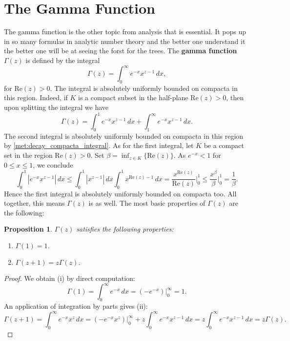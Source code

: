 \documentclass[12pt]{book}
\newtheorem{proposition}{Proposition}[section]
\theoremstyle{definition}\newframedtheorem{method}{Method}
\renewcommand{\b}{\beta}
\newcommand{\G}{\Gamma}
\newcommand{\<}{\langle}
\renewcommand{\>}{\rangle}
\renewcommand{\Re}{\mathrm{Re}}
\begin{document}
  \section{The Gamma Function}
    The gamma function is the other topic from analysis that is essential. It pops up in so many formulas in analytic number theory and the better one understand it the better one will be at seeing the forst for the trees. The \textbf{gamma function} $\G(z)$ is defined by the integral
    \[
      \G(z) = \int_{0}^{\infty}e^{-x}x^{z-1}\,dx,
    \]
    for $\Re(z) > 0$. The integral is absolutely uniformly bounded on compacta in this region. Indeed, if $K$ is a compact subset in the half-plane $\Re(z) > 0$, then upon splitting the integral we have
    \[
      \G(z) = \int_{0}^{1}e^{-x}x^{z-1}\,dx+\int_{1}^{\infty}e^{-x}x^{z-1}\,dx.
    \]
    The second integral is absolutely uniformly bounded on compacta in this region by \cref{met:decay_compacta_integral}. As for the first integral, let $K$ be a compact set in the region $\Re(z) > 0$. Set $\b = \inf_{z \in K}\{\Re(z)\}$. As $e^{-x} < 1$ for $0 \le x \le 1$, we conclude
    \[
      \int_{0}^{1}|e^{-x}x^{z-1}|\,dx \le \int_{0}^{1}|x^{z-1}|\,dx \int_{0}^{1}x^{\Re(z)-1}\,dx = \frac{x^{\Re(z)}}{\Re(z)}\bigg|_{0}^{1} \le \frac{x^{\b}}{\b}\bigg|_{0}^{1} = \frac{1}{\b}.
    \]
    Hence the first integral is absolutely uniformly bounded on compacta too. All together, this means $\G(z)$ is as well. The most basic properties of $\G(z)$ are the following:

    \begin{proposition}\label{prop:Factorial_properties_of_gamma_function}
      $\G(z)$ satisfies the following properties:
      \begin{enumerate}[label=(\roman*)]
        \item $\G(1) = 1$.
        \item $\G(z+1) = z\G(z)$.
      \end{enumerate}
    \end{proposition}
    \begin{proof}
      We obtain (i) by direct computation:
      \[
        \G(1) = \int_{0}^{\infty}e^{-x}\,dx = (-e^{-x})\bigg|_{0}^{\infty} = 1.
      \]
      An application of integration by parts gives (ii):
      \[
        \G(z+1) = \int_{0}^{\infty}e^{-x}x^{z}\,dx = (-e^{-x}x^{z})\bigg|_{0}^{\infty}+z\int_{0}^{\infty}e^{-x}x^{z-1}\,dx = z\int_{0}^{\infty}e^{-x}x^{z-1}\,dx = z\G(z).
      \]
    \end{proof}
\end{document}
